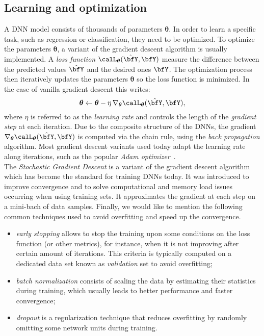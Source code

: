 \subsection{Learning and optimization}
\newcommand{\params}{\ensuremath{\boldsymbol{\theta}}}
A \ac{DNN} model consists of thousands of parameters $\params$.
In order to learn a specific task, such as regression or classification, they need to be optimized.
To optimize the parameters $\params$, a variant of the gradient descent algorithm is usually implemented.
A \textit{loss function} $\calL_{\params}(\hat{\bfY},\bfY)$ measure the difference between the predicted values $\hat{\bfY}$ and the desired ones $\bfY$.
The optimization process then iteratively updates the parameters $\params$ so the loss function is minimized.
In the case of vanilla gradient descent this writes:
\begin{equation*}
    \params \gets \params - \eta \knabla_{\params} \calL_{\params}(\hat{\bfY},\bfY)
    ,
\end{equation*}
where $\eta$ is referred to as the \textit{learning rate} and controls the length of the \textit{gradient step} at each iteration.
Due to the composite structure of the \acp{DNN}, the gradient $\knabla_{\params} \calL_{\params}(\hat{\bfY},\bfY)$ is computed via the chain rule, using the \textit{back propagation} algorithm.
Most gradient descent variants used today adapt the learning rate along iterations, such as the popular \textit{Adam optimizer}~.
\\The \textit{Stochastic Gradient Descent} is a variant of the gradient descent algorithm which has become the standard for training \acp{DNN} today.
It was introduced to improve convergence and to solve computational and memory load issues occurring when using training sets.
It approximates the gradient at each step on a mini-bach of data samples.
Finally, we would like to mention the following common techniques used to avoid overfitting and speed up the convergence.
\begin{itemize}
    \item \textit{early stopping} allows to stop the training upon some conditions on the loss function (or other metrics), for instance, when it is not improving after certain amount of iterations.
    This criteria is typically computed on a dedicated data set known as \textit{validation} set to avoid overfitting;
    \item \textit{batch normalization} consists of scaling the data by estimating their statistics during training, which usually leads to better performance and faster convergence;
    \item \textit{dropout} is a regularization technique that reduces overfitting by randomly omitting some network units during training.
\end{itemize}

